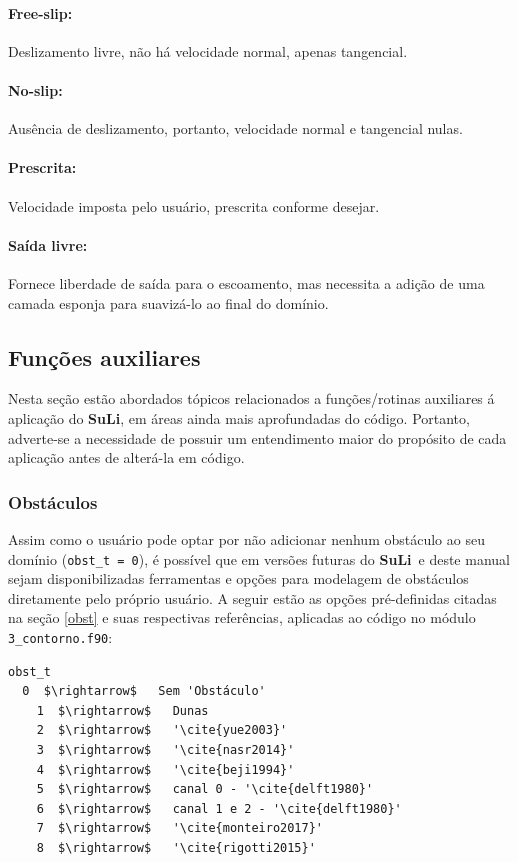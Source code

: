 \documentclass[12pt, a4paper]{article}
\newcommand{\SL}{{\bf SuLi}}
\begin{document}
\paragraph{Free-slip:} Deslizamento livre, não há velocidade normal, apenas tangencial.
\paragraph{No-slip:} Ausência de deslizamento, portanto, velocidade normal e tangencial nulas.
\paragraph{Prescrita:} Velocidade imposta pelo usuário, prescrita conforme desejar.
\paragraph{Saída livre:} Fornece liberdade de saída para o escoamento, mas necessita a adição de uma camada esponja para suavizá-lo ao final do domínio.




\subsection{Funções auxiliares}
Nesta seção estão abordados tópicos relacionados a funções/rotinas auxiliares á aplicação do \SL, em áreas ainda mais aprofundadas do código. Portanto, adverte-se a necessidade de possuir um entendimento maior do propósito de cada aplicação antes de alterá-la em código.

\subsubsection{Obstáculos} \label{met_num}
Assim como o usuário pode optar por não adicionar nenhum obstáculo ao seu domínio (\verb|obst_t = 0|), é possível que em versões futuras do \SL\ e deste manual sejam disponibilizadas ferramentas e opções para modelagem de obstáculos diretamente pelo próprio usuário. A seguir estão as opções pré-definidas citadas na seção \ref{obst} e suas respectivas referências, aplicadas ao código no módulo \verb|3_contorno.f90|:

\begin{lstlisting}[escapeinside='']
obst_t	
  0  $\rightarrow$   Sem 'Obstáculo'
	1  $\rightarrow$   Dunas
	2  $\rightarrow$   '\cite{yue2003}'
	3  $\rightarrow$   '\cite{nasr2014}'
	4  $\rightarrow$   '\cite{beji1994}'
	5  $\rightarrow$   canal 0 - '\cite{delft1980}'
	6  $\rightarrow$   canal 1 e 2 - '\cite{delft1980}'
	7  $\rightarrow$   '\cite{monteiro2017}'
	8  $\rightarrow$   '\cite{rigotti2015}'
\end{lstlisting}
\end{document}
